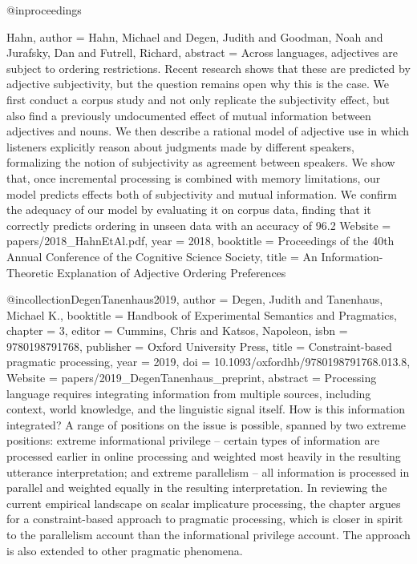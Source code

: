 @inproceedings{Hahn,
author = {Hahn, Michael and Degen, Judith and Goodman, Noah and Jurafsky, Dan and Futrell, Richard},
abstract = {Across languages, adjectives are subject to ordering restrictions. Recent research shows that these are predicted by adjective subjectivity, but the question remains open why this is the case. We first conduct a corpus study and not only replicate the subjectivity effect, but also find a previously undocumented effect of mutual information between adjectives and nouns. We then describe a rational model of adjective use in which listeners explicitly reason about judgments made by different speakers, formalizing the notion of subjectivity as agreement between speakers. We show that, once incremental processing is combined with memory limitations, our model predicts effects both of subjectivity and mutual information. We confirm the adequacy of our model by evaluating it on corpus data, finding that it correctly predicts ordering in unseen data with an accuracy of 96.2 %
Website = {papers/2018_HahnEtAl.pdf},
year = {2018},
booktitle = {Proceedings of the 40th Annual Conference of the Cognitive Science Society},
title = {{An Information-Theoretic Explanation of Adjective Ordering Preferences}}
}

@incollection{DegenTanenhaus2019,
author = {Degen, Judith and Tanenhaus, Michael K.},
booktitle = {Handbook of Experimental Semantics and Pragmatics},
chapter = {3},
editor = {Cummins, Chris and Katsos, Napoleon},
isbn = {9780198791768},
publisher = {Oxford University Press},
title = {{Constraint-based pragmatic processing}},
year = {2019},
doi = {10.1093/oxfordhb/9780198791768.013.8},
Website = {papers/2019_DegenTanenhaus_preprint},
abstract = {Processing language requires integrating information from multiple sources, including context, world knowledge, and the linguistic signal itself. How is this information integrated? A range of positions on the issue is possible, spanned by two extreme positions: extreme informational privilege -- certain types of information are processed earlier in online processing and weighted most heavily in the resulting utterance interpretation; and extreme parallelism -- all information is processed in parallel and weighted equally in the resulting interpretation. In reviewing the current empirical landscape on scalar implicature processing, the chapter argues for a constraint-based approach to pragmatic processing, which is closer in spirit to the parallelism account than the informational privilege account. The approach is also extended to other pragmatic phenomena.}
}

}
